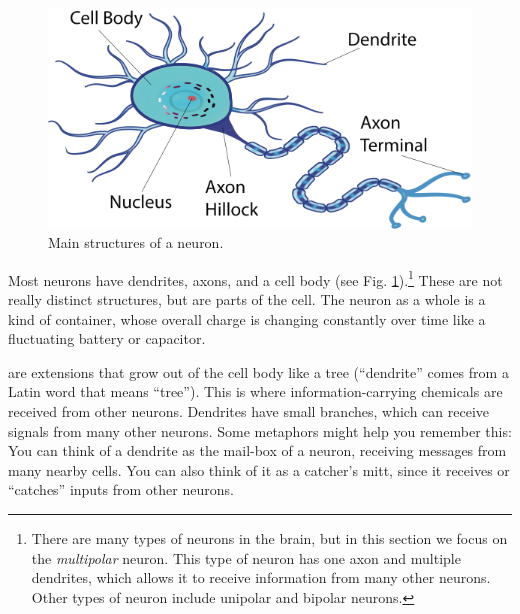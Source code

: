 \begin{figure}[h]
\centering
\includegraphics[width=.5\textwidth]{./images/neuron.png}
\caption[Pamela Payne.]{Main structures of a neuron.}
\label{f:neuron}
\end{figure}

Most neurons have dendrites, axons, and a cell body (see Fig. \ref{f:neuron}).\footnote{There are many types of neurons in the brain, but in this section we focus on the \emph{multipolar} neuron. This type of neuron has one axon and multiple dendrites, which allows it to receive information from many other neurons. Other types of neuron include unipolar and bipolar neurons.}  These are not really distinct structures, but are parts of the cell. The neuron as a whole is a kind of container, whose overall charge is changing constantly over time like a fluctuating battery or capacitor. 

 are extensions that grow out of the cell body like a tree (``dendrite'' comes from a Latin word that means ``tree''). This is where information-carrying chemicals are received from other neurons. Dendrites have small branches, which can receive signals from many other neurons. Some metaphors might help you remember this: You can think of a dendrite as the mail-box of a neuron, receiving messages from many nearby cells. You can also think of it as a catcher's mitt, since it receives or ``catches'' inputs from other neurons.

